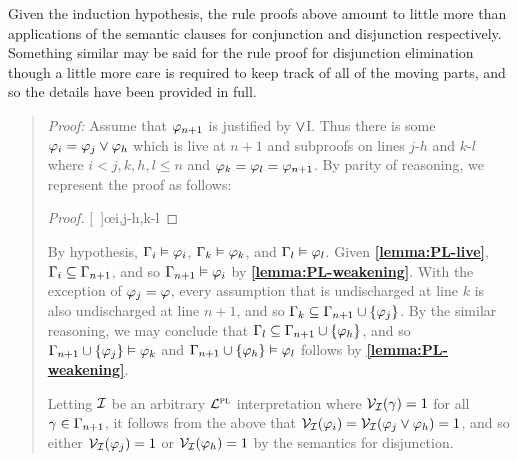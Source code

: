 Given the induction hypothesis, the rule proofs above amount to little more than applications of the semantic clauses for conjunction and disjunction respectively.
Something similar may be said for the rule proof for disjunction elimination though a little more care is required to keep track of all of the moving parts, and so the details have been provided in full.


\begin{quote} 
  \textit{Proof:}
  Assume that $\varphi_{n+1}$ is justified by $\vee$I.
  Thus there is some $\varphi_i=\varphi_j\vee\varphi_h$ which is live at $n+1$ and subproofs on lines $j$-$h$ and $k$-$l$ where $i<j,k,h,l\leq n$ and $\varphi_k=\varphi_l=\varphi_{n+1}$.
  By parity of reasoning, we represent the proof as follows:

  \begin{proof}
  \open
     
  \close
  \open
     
  \close
  [\ ]{\metaC}\oe{i,j-h,k-l} 
  \end{proof}

  By hypothesis, $\Gamma_i\vDash \varphi_i$, $\Gamma_k\vDash \varphi_k$, and $\Gamma_l\vDash \varphi_l$.
  Given \textbf{\ref{lemma:PL-live}}, $\Gamma_i\subseteq \Gamma_{n+1}$, and so $\Gamma_{n+1} \vDash \varphi_i$ by \textbf{\ref{lemma:PL-weakening}}.
  With the exception of $\varphi_j=\varphi$, every assumption that is undischarged at line $k$ is also undischarged at line $n+1$, and so $\Gamma_k\subseteq\Gamma_{n+1}\cup\lbrace\varphi_j\rbrace$.
  By the similar reasoning, we may conclude that $\Gamma_l\subseteq\Gamma_{n+1}\cup\lbrace\varphi_h\rbrace$, and so $\Gamma_{n+1}\cup\lbrace\varphi_j\rbrace \vDash \varphi_k$ and $\Gamma_{n+1}\cup\lbrace\varphi_h\rbrace \vDash \varphi_l$ follows by \textbf{\ref{lemma:PL-weakening}}.

  Letting $\mathcal{I}$ be an arbitrary $\mathcal{L}^{\textsc{pl}}$ interpretation where $\mathcal{V}_{\mathcal{I}}(\gamma) = 1$ for all $\gamma \in \Gamma_{n+1}$, it follows from the above that $\mathcal{V}_{\mathcal{I}}(\varphi_i) = \mathcal{V}_{\mathcal{I}}(\varphi_j \vee \varphi_h) = 1$, and so either $\mathcal{V}_{\mathcal{I}}(\varphi_j) = 1$ or $\mathcal{V}_{\mathcal{I}}(\varphi_h) = 1$ by the semantics for disjunction.


\end{quote}
